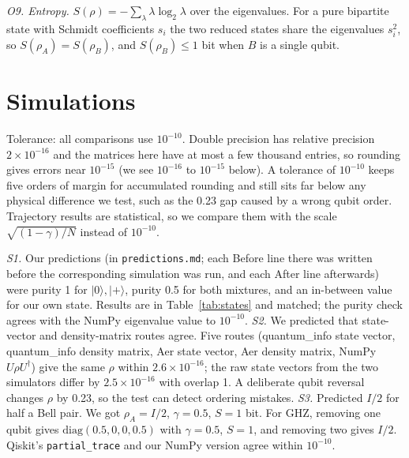 \documentclass[10pt]{article}
\newcommand{\lab}[1]{\noindent\textit{#1}\;}
\begin{document}
\lab{O9. Entropy.} $S(\rho)=-\sum_\lambda\lambda\log_2\lambda$ over the eigenvalues. For a pure bipartite state with Schmidt coefficients $s_i$ the two reduced states share the eigenvalues $s_i^2$, so $S(\rho_A)=S(\rho_B)$, and $S(\rho_B)\le1$ bit when $B$ is a single qubit.

\section{Simulations}
Tolerance: all comparisons use $10^{-10}$. Double precision has relative precision $2\times10^{-16}$ and the matrices here have at most a few thousand entries, so rounding gives errors near $10^{-15}$ (we see $10^{-16}$ to $10^{-15}$ below). A tolerance of $10^{-10}$ keeps five orders of margin for accumulated rounding and still sits far below any physical difference we test, such as the 0.23 gap caused by a wrong qubit order. Trajectory results are statistical, so we compare them with the scale $\sqrt{(1-\gamma)/N}$ instead of $10^{-10}$.

\lab{S1.} Our predictions (in \texttt{predictions.md}; each Before line there was written before the corresponding simulation was run, and each After line afterwards) were purity 1 for $|0\rangle,|+\rangle$, purity 0.5 for both mixtures, and an in-between value for our own state. Results are in Table~\ref{tab:states} and matched; the purity check agrees with the NumPy eigenvalue value to $10^{-10}$. \lab{S2.} We predicted that state-vector and density-matrix routes agree. Five routes (quantum\_info state vector, quantum\_info density matrix, Aer state vector, Aer density matrix, NumPy $U\rho U^\dagger$) give the same $\rho$ within $2.6\times10^{-16}$; the raw state vectors from the two simulators differ by $2.5\times10^{-16}$ with overlap 1. A deliberate qubit reversal changes $\rho$ by 0.23, so the test can detect ordering mistakes. \lab{S3.} Predicted $I/2$ for half a Bell pair. We got $\rho_A=I/2$, $\gamma=0.5$, $S=1$ bit. For GHZ, removing one qubit gives $\mathrm{diag}(0.5,0,0,0.5)$ with $\gamma=0.5$, $S=1$, and removing two gives $I/2$. Qiskit's \texttt{partial\_trace} and our NumPy version agree within $10^{-10}$.
\end{document}
